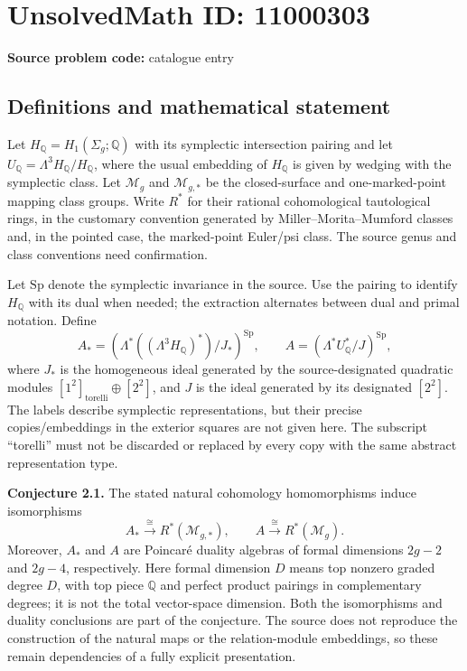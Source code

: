 \documentclass[11pt]{article}
\newcommand{\Q}{\mathbb{Q}}
\begin{document}
\section*{UnsolvedMath ID: 11000303}
\textbf{Source problem code:} catalogue entry
\subsection{Definitions and mathematical statement}
Let $H_{\Q}=H_1(\Sigma_g;\Q)$ with its symplectic intersection pairing and let $U_{\Q}=\Lambda^3H_{\Q}/H_{\Q}$, where the usual embedding of $H_{\Q}$ is given by wedging with the symplectic class. Let $\mathcal M_g$ and $\mathcal M_{g,*}$ be the closed-surface and one-marked-point mapping class groups. Write $R^*$ for their rational cohomological tautological rings, in the customary convention generated by Miller--Morita--Mumford classes and, in the pointed case, the marked-point Euler/psi class. The source genus and class conventions need confirmation.

Let $\mathrm{Sp}$ denote the symplectic invariance in the source. Use the pairing to identify $H_{\Q}$ with its dual when needed; the extraction alternates between dual and primal notation. Define
\[
 A_*={\left(\Lambda^*((\Lambda^3H_{\Q})^*)/J_*\right)}^{\mathrm{Sp}},\qquad
 A={\left(\Lambda^*U_{\Q}^*/J\right)}^{\mathrm{Sp}},
\]
where $J_*$ is the homogeneous ideal generated by the source-designated quadratic modules $[1^2]_{\mathrm{torelli}}\oplus[2^2]$, and $J$ is the ideal generated by its designated $[2^2]$. The labels describe symplectic representations, but their precise copies/embeddings in the exterior squares are not given here. The subscript ``torelli'' must not be discarded or replaced by every copy with the same abstract representation type.

\textbf{Conjecture 2.1.} The stated natural cohomology homomorphisms induce isomorphisms
\[
 A_*\xrightarrow{\cong}R^*(\mathcal M_{g,*}),\qquad
 A\xrightarrow{\cong}R^*(\mathcal M_g).
\]
Moreover, $A_*$ and $A$ are Poincar\'e duality algebras of formal dimensions $2g-2$ and $2g-4$, respectively. Here formal dimension $D$ means top nonzero graded degree $D$, with top piece $\Q$ and perfect product pairings in complementary degrees; it is not the total vector-space dimension. Both the isomorphisms and duality conclusions are part of the conjecture. The source does not reproduce the construction of the natural maps or the relation-module embeddings, so these remain dependencies of a fully explicit presentation.
\end{document}

